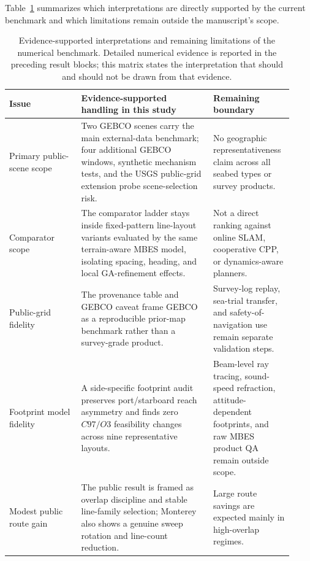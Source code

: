 \documentclass[jmse,article,submit,moreauthors]{Definitions/mdpi}
\begin{document}
Table~\ref{tab:reviewer_risk_matrix} summarizes which interpretations are directly supported by the current benchmark and which limitations remain outside the manuscript's scope.

\begin{table}[!htbp]
	\centering
	\caption{Evidence-supported interpretations and remaining limitations of the numerical benchmark. Detailed numerical evidence is reported in the preceding result blocks; this matrix states the interpretation that should and should not be drawn from that evidence.}
	\label{tab:reviewer_risk_matrix}
	\scriptsize
	\renewcommand{\arraystretch}{1.10}
	\setlength{\tabcolsep}{3.4pt}
	\begin{tabular}{@{}>{\raggedright\arraybackslash}p{0.24\linewidth}>{\raggedright\arraybackslash}p{0.44\linewidth}>{\raggedright\arraybackslash}p{0.24\linewidth}@{}}
		\toprule[1bp]
		\textbf{Issue} & \textbf{Evidence-supported handling in this study} & \textbf{Remaining boundary} \\
		\midrule[1bp]
		Primary public-scene scope & Two GEBCO scenes carry the main external-data benchmark; four additional GEBCO windows, synthetic mechanism tests, and the USGS public-grid extension probe scene-selection risk. & No geographic representativeness claim across all seabed types or survey products. \\
		Comparator scope & The comparator ladder stays inside fixed-pattern line-layout variants evaluated by the same terrain-aware MBES model, isolating spacing, heading, and local GA-refinement effects. & Not a direct ranking against online SLAM, cooperative CPP, or dynamics-aware planners. \\
		Public-grid fidelity & The provenance table and GEBCO caveat frame GEBCO as a reproducible prior-map benchmark rather than a survey-grade product. & Survey-log replay, sea-trial transfer, and safety-of-navigation use remain separate validation steps. \\
		Footprint model fidelity & A side-specific footprint audit preserves port/starboard reach asymmetry and finds zero \(C97/O3\) feasibility changes across nine representative layouts. & Beam-level ray tracing, sound-speed refraction, attitude-dependent footprints, and raw MBES product QA remain outside scope. \\
		Modest public route gain & The public result is framed as overlap discipline and stable line-family selection; Monterey also shows a genuine sweep rotation and line-count reduction. & Large route savings are expected mainly in high-overlap regimes. \\

\end{tabular}
\end{table}
\end{document}
